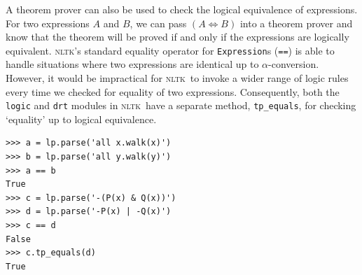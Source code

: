 \documentclass[11pt, a4paper]{article}
\newcommand{\NLTK}{\textsc{nltk}}
\begin{document}
A theorem prover can also be used to check the logical equivalence of
expressions.  For two expressions $A$ and $B$, we can pass $(A\iff B)$
into a theorem prover and know that the theorem will be proved if and
only if the expressions are logically equivalent.  \NLTK's standard
equality operator for \texttt{Expression}s (\texttt{==}) is able to
handle situations where two expressions are identical up to
$\alpha$-conversion.  However, it would be impractical for \NLTK\ to
invoke a wider range of logic rules every time we checked for equality
of two expressions. Consequently, both the \texttt{logic} and 
\texttt{drt} modules in \NLTK\ 
have a separate method, \texttt{tp\_equals}, for checking `equality'
up to logical equivalence.
\newpage
\begin{Verbatim}
>>> a = lp.parse('all x.walk(x)')
>>> b = lp.parse('all y.walk(y)')
>>> a == b
True
>>> c = lp.parse('-(P(x) & Q(x))')
>>> d = lp.parse('-P(x) | -Q(x)')
>>> c == d
False
>>> c.tp_equals(d)
True
\end{Verbatim}



\end{document}
